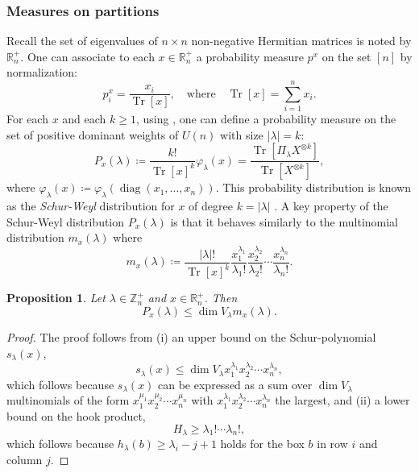 \documentclass[notitlepage, 11pt, letterpaper]{amsart}
\theoremstyle{plain}
\newtheorem{prop}[thm]{Proposition}
\theoremstyle{definition}
\let\cref\crtcref
\DeclareMathOperator{\diag}{diag}
\DeclareMathOperator{\Tr}{Tr}
\newcommand{\SW}[1]{P_{#1}}
\newcommand{\undomweightsp}[1]{\mathbb Z^{+}_{#1}}
\newcommand{\eigsp}[1]{\mathbb R^{+}_{#1}}
\newcommand{\ot}{\otimes} %
\newcommand{\vp}{\varphi} %
\newcommand{\ex}{x}
\newcommand{\tex}{\Tr[\ex]}
\newcommand{\yx}{\lambda}
\newcommand{\syx}{|\yx|}
\begin{document}
\subsubsection{Measures on partitions}

Recall the set of eigenvalues of $n\times n$ non-negative Hermitian matrices is noted by $\eigsp{n}$.
One can associate to each $\ex \in \eigsp{n}$ a probability measure $p^\ex$ on the set $[n]$ by normalization:
\begin{equation}
    p^\ex_i = \frac{\ex_i}{\tex}, \quad \text{where} \quad \tex = \sum_{i=1}^n \ex_i.
\end{equation}
For each $\ex$ and each $k \geq 1$, using \cref{eq:varphi_normalization}, one can define a probability measure on the set of positive dominant weights of $U(n)$ with size $\syx = k$:
\begin{equation}
    \label{eq:schur_weyl_dist}
    \SW{\ex}(\yx) \coloneqq \frac{k!}{\tex^k} \vp_\yx(x) = \frac{\Tr[\Pi_{\yx} X^{\ot k}]}{\Tr[X^{\ot k}]},
\end{equation}
where $\vp_\yx(x) \coloneqq \vp_{\yx}(\diag(\ex_1, \ldots, \ex_n))$.
This probability distribution is known as the \textit{Schur-Weyl} distribution for $x$ of degree $k = \syx$ \cite{odonnell2016efficient}.
A key property of the Schur-Weyl distribution $\SW{\ex}(\yx)$ is that it behaves similarly to the multinomial distribution $m_{\ex}(\yx)$ where
\begin{equation}
    m_{\ex}(\yx) \coloneqq \frac{\syx!}{\tex^{k}}\frac{\ex_1^{\yx_1}}{\yx_1!}\frac{\ex_2^{\yx_2}}{\yx_2!} \cdots \frac{\ex_n^{\yx_n}}{\yx_n!}.
\end{equation}
\begin{prop}
    \label{prop:multinomial_bound}
    Let $\yx \in \undomweightsp{n}$ and $\ex \in \eigsp{n}$.
    Then
    \begin{equation}
        \SW{\ex}(\yx) \leq \dim V_{\yx} m_{\ex}(\yx).
    \end{equation}
\end{prop}
\begin{proof}
    The proof follows from (i) an upper bound on the Schur-polynomial $s_{\yx}(\ex)$,
    \begin{equation}
        s_{\yx}(\ex) \leq \dim V_{\yx} \ex_1^{\yx_1}\ex_2^{\yx_2}\cdots \ex_n^{\yx_n},
    \end{equation}
    which follows because $s_{\yx}(\ex)$ can be expressed as a sum over $\dim V_{\yx}$ multinomials of the form $\ex_1^{\mu_1}\ex_2^{\mu_2}\cdots \ex_n^{\mu_n}$ with $\ex_1^{\yx_1}\ex_2^{\yx_2}\cdots \ex_n^{\yx_n}$ the largest, and (ii) a lower bound on the hook product,
    \begin{equation}
        H_{\yx} \geq \yx_1!\cdots \yx_n!,
    \end{equation}
    which follows because $h_{\yx}(b) \geq \yx_i - j + 1$ holds for the box $b$ in row $i$ and column $j$.
\end{proof}
\end{document}
